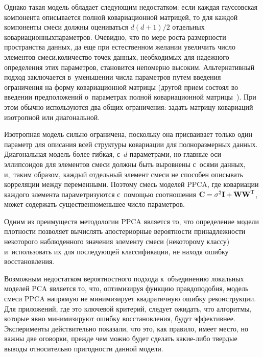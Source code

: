 \begin{multicols}{2}
Однако такая 
модель %
обладает следующим недостатком: если каж\-дая гауссовская компонента 
описывается полной ковариационной мат\-ри\-цей, то для каждой компоненты 
смеси должны оцениваться $d(d+1)/2$ отдельных ковариационных\linebreak па\-ра\-метров.
Очевидно, что по мере роста размер\-ности пространства данных, да еще при 
естест\-вен\-ном желании увеличить число элементов смеси,\linebreak количество точек 
данных, необходимых для надежного определения этих па\-ра\-мет\-ров, становится 
непомерно высоким.
%
 Альтернативный подход заключается в~уменьшении  
чис\-ла параметров путем введения ограничения на форму ковариационной 
мат\-ри\-цы (другой прием со\-сто\-ял во введении предположений  
о~па\-ра\-мет\-рах полной ковариационной матрицы~\cite{6-kri}). При этом 
обычно используются два общих ограничения: задать мат\-ри\-цу ковариаций 
изотропной или диагональной. 

Изотропная модель сильно ограничена, 
поскольку она присваивает только один параметр для описания всей структуры 
ковариации для полноразмерных данных. Диагональная модель более гибкая, 
с~$d$ па\-ра\-мет\-ра\-ми, но главные оси эллипсоидов для элементов смеси 
должны быть выровнены\linebreak
 с~осями данных, и,~таким образом, каж\-дый 
от\-дельный элемент смеси не способен описывать корреляции меж\-ду 
переменными. Поэтому смесь моделей PPCA, где ковариации каждого элемента\linebreak 
пара\-мет\-ри\-зуются с~по\-мощью соотношения $\mathbf{C}\hm= 
\sigma^2\mathbf{I}\hm+\mathbf{WW}^{\mathrm{T}}$, может содержать 
существенно\linebreak меньшее чис\-ло па\-ра\-метров.
     
     Одним из преимуществ методологии PPCA является то, что определение 
модели плотности позволяет вы\-чис\-лять апостериорные вероятности 
принадлежности некоторого наблюденного значения элементу смеси 
(некоторому классу) и~использовать их для последующей классификации, не 
находя ошибку восстановления.
     
     Возможным недостатком вероятностного подхо\-да к~объединению 
локальных моделей PCA является то, что, оптимизируя функцию 
правдоподобия, модель смеси PPCA напрямую не минимизирует квадратичную 
ошибку реконструкции. Для приложений, где это ключевой критерий, следует 
ожидать, что алгоритмы, которые явно минимизируют ошибку восстановления, 
будут эффективнее. Эксперименты действительно показали, что это, как 
правило, имеет место, но важны две оговорки, прежде чем можно будет сделать 
ка\-кие-ли\-бо твердые выводы относительно пригодности данной модели.  


\end{multicols}
